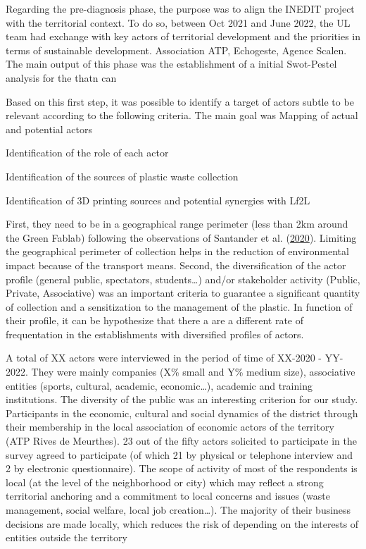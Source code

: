 \documentclass[
  11pt,
]{article}
\begin{document}
Regarding the pre-diagnosis phase, the purpose was to align the INEDIT
project with the territorial context. To do so, between Oct 2021 and
June 2022, the UL team had exchange with key actors of territorial
development and the priorities in terms of sustainable development.
Association ATP, Echogeste, Agence Scalen. The main output of this phase
was the establishment of a initial Swot-Pestel analysis for the thatn
can

Based on this first step, it was possible to identify a target of actors
subtle to be relevant according to the following criteria. The main goal
was Mapping of actual and potential actors

Identification of the role of each actor

Identification of the sources of plastic waste collection

Identification of 3D printing sources and potential synergies with Lf2L

First, they need to be in a geographical range perimeter (less than 2km
around the Green Fablab) following the observations of Santander et al.
(\protect\hyperlink{ref-Santander2020}{2020}). Limiting the geographical
perimeter of collection helps in the reduction of environmental impact
because of the transport means. Second, the diversification of the actor
profile (general public, spectators, students\ldots) and/or stakeholder
activity (Public, Private, Associative) was an important criteria to
guarantee a significant quantity of collection and a sensitization to
the management of the plastic. In function of their profile, it can be
hypothesize that there a are a different rate of frequentation in the
establishments with diversified profiles of actors.

A total of XX actors were interviewed in the period of time of XX-2020 -
YY-2022. They were mainly companies (X\% small and Y\% medium size),
associative entities (sports, cultural, academic, economic\ldots),
academic and training institutions. The diversity of the public was an
interesting criterion for our study. Participants in the economic,
cultural and social dynamics of the district through their membership in
the local association of economic actors of the territory (ATP Rives de
Meurthes). 23 out of the fifty actors solicited to participate in the
survey agreed to participate (of which 21 by physical or telephone
interview and 2 by electronic questionnaire). The scope of activity of
most of the respondents is local (at the level of the neighborhood or
city) which may reflect a strong territorial anchoring and a commitment
to local concerns and issues (waste management, social welfare, local
job creation\ldots). The majority of their business decisions are made
locally, which reduces the risk of depending on the interests of
entities outside the territory
\end{document}
